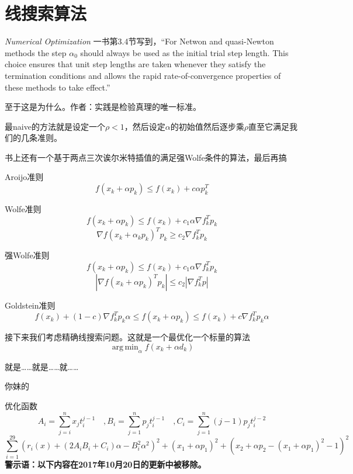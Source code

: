 \documentclass[a4paper, 11pt]{article}
\begin{document}
\section{线搜索算法}

\textit{Numerical Optimization} 一书第3.4节写到，``For Netwon and quasi-Newton methods the step $\alpha_0$ should always be used as the initial trial step length. This choice ensures that unit step lengths are taken whenever they satisfy the termination conditions and allows the rapid rate-of-convergence properties of these methods to take effect.''

至于这是为什么。作者：实践是检验真理的唯一标准。

最naive的方法就是设定一个$\rho<1$，然后设定$\alpha$的初始值然后逐步乘$\rho$直至它满足我们的几条准则。

书上还有一个基于两点三次诶尔米特插值的满足强Wolfe条件的算法，最后再搞

Aroijo准则
\[f(x_k+\alpha p_k)\le f(x_k)+c\alpha p_k^T\]

Wolfe准则
\[f(x_k+\alpha p_k)\le f(x_k)+c_1\alpha\nabla f_k^Tp_k\]
\[\nabla f(x_k+\alpha_kp_k)^Tp_k \ge c_2\nabla f_k^Tp_k\]

强Wolfe准则
\[f(x_k+\alpha p_k)\le f(x_k)+c_1\alpha\nabla f_k^Tp_k\]
\[|\nabla f(x_k+\alpha p_k)^Tp_k| \le c_2|\nabla f_k^Tp|\]

Goldstein准则
\[f(x_k)+(1-c)\nabla f_k^Tp_k\alpha \le f(x_k+\alpha p_k)\le f(x_k)+c\nabla f_k^T p_k\alpha\]

接下来我们考虑精确线搜索问题。这就是一个最优化一个标量的算法
\[\mathop{\arg\,\min}_\alpha f(x_k+\alpha d_k)\]

就是……就是……就……

你妹的

优化函数
\[
A_i=\sum_{j=i}^{n}x_jt_i^{j-1}\quad, B_i=\sum_{j=1}^np_jt_i^{j-1}\quad, C_i=\sum_{j=1}^n(j-1)p_jt_i^{j-2}
\]
\[
\sum_{i=1}^{29}\left(r_i(x)+\left(2A_iB_i+C_i\right)\alpha -B_i^2\alpha^2\right)^2+(x_1+\alpha p_1)^2+(x_2+\alpha p_2-(x_1+\alpha p_1)^2-1)^2
\]
\newpage
\textbf{\large 警示语：以下内容在2017年10月20日的更新中被移除。}
\vspace{10pt}
\end{document}
